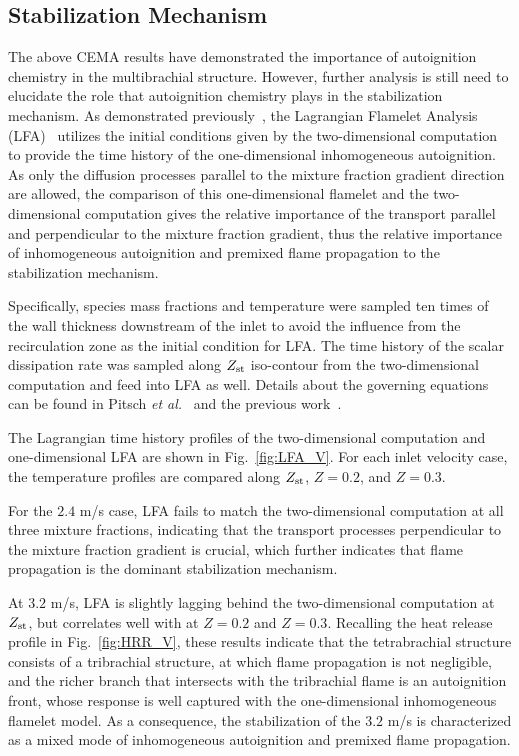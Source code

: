 \documentclass{wssci}
\begin{document}
\subsection{Stabilization Mechanism} 
The above CEMA results have demonstrated the importance of autoignition chemistry in the multibrachial structure.  However, further analysis is still need to elucidate the role that autoignition chemistry plays in the stabilization mechanism.  As demonstrated previously~\cite{deng15}, the Lagrangian Flamelet Analysis (LFA)~\cite{pitsch98a} utilizes the initial conditions given by the two-dimensional computation to provide the time history of the one-dimensional inhomogeneous autoignition.  As only the diffusion processes parallel to the mixture fraction gradient direction are allowed, the comparison of this one-dimensional flamelet and the two-dimensional computation gives the relative importance of the transport parallel and perpendicular to the mixture fraction gradient, thus the relative importance of inhomogeneous autoignition and premixed flame propagation to the stabilization mechanism.

Specifically, species mass fractions and temperature were sampled ten times of the wall thickness downstream of the inlet to avoid the influence from the recirculation zone as the initial condition for LFA.  The time history of the scalar dissipation rate was sampled along $Z_{\rm st}$ iso-contour from the two-dimensional computation and feed into LFA as well.  Details about the governing equations can be found in Pitsch \emph{et al.}~\cite{pitsch98a} and the previous work~\cite{deng15}.

The Lagrangian time history profiles of the two-dimensional computation and one-dimensional LFA are shown in Fig.~\ref{fig:LFA_V}.  For each inlet velocity case, the temperature profiles are compared along $Z_{\rm st}$, $Z = 0.2$, and $Z = 0.3$.  

For the $2.4$ m/s case, LFA fails to match the two-dimensional computation at all three mixture fractions, indicating that the transport processes perpendicular to the mixture fraction gradient is crucial, which further indicates that flame propagation is the dominant stabilization mechanism.

At $3.2$ m/s, LFA is slightly lagging behind the two-dimensional computation at $Z_{\rm st}$, but correlates well with at $Z = 0.2$ and $Z = 0.3$.  Recalling the heat release profile in Fig.~\ref{fig:HRR_V}, these results indicate that the tetrabrachial structure consists of a tribrachial structure, at which flame propagation is not negligible, and the richer branch that intersects with the tribrachial flame is an autoignition front, whose response is well captured with the one-dimensional inhomogeneous flamelet model.  As a consequence, the stabilization of the $3.2$ m/s is characterized as a mixed mode of inhomogeneous autoignition and premixed flame propagation.
\end{document}
